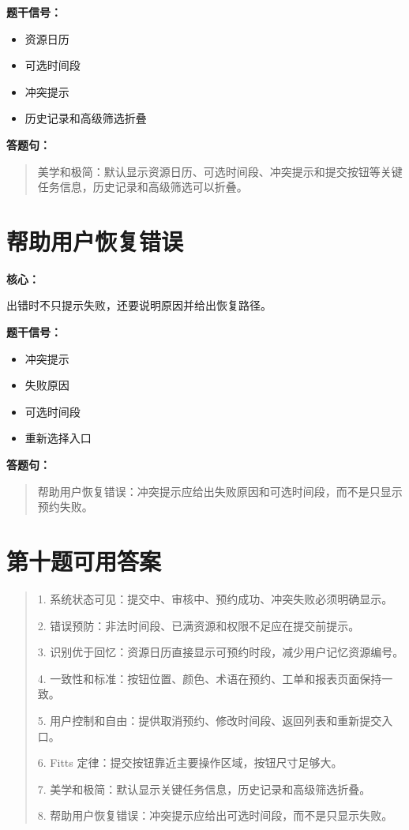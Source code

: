 \documentclass[UTF8,zihao=-4]{ctexart}
\newcommand{\principle}[1]{%
  \section*{\color{TitleBlue}#1}
}
\newcommand{\labeltext}[1]{%
  \textbf{#1}
}
\newenvironment{answerbox}{%
  \begin{quote}\small\color{TextGray}
}{%
  \end{quote}
}
\begin{document}
\labeltext{题干信号：}
\begin{itemize}
  \item 资源日历
  \item 可选时间段
  \item 冲突提示
  \item 历史记录和高级筛选折叠
\end{itemize}

\labeltext{答题句：}
\begin{answerbox}
美学和极简：默认显示资源日历、可选时间段、冲突提示和提交按钮等关键任务信息，历史记录和高级筛选可以折叠。
\end{answerbox}

\principle{帮助用户恢复错误}

\labeltext{核心：}
出错时不只提示失败，还要说明原因并给出恢复路径。

\labeltext{题干信号：}
\begin{itemize}
  \item 冲突提示
  \item 失败原因
  \item 可选时间段
  \item 重新选择入口
\end{itemize}

\labeltext{答题句：}
\begin{answerbox}
帮助用户恢复错误：冲突提示应给出失败原因和可选时间段，而不是只显示预约失败。
\end{answerbox}

\section*{\color{TitleBlue}第十题可用答案}

\begin{answerbox}
1. 系统状态可见：提交中、审核中、预约成功、冲突失败必须明确显示。

2. 错误预防：非法时间段、已满资源和权限不足应在提交前提示。

3. 识别优于回忆：资源日历直接显示可预约时段，减少用户记忆资源编号。

4. 一致性和标准：按钮位置、颜色、术语在预约、工单和报表页面保持一致。

5. 用户控制和自由：提供取消预约、修改时间段、返回列表和重新提交入口。

6. Fitts 定律：提交按钮靠近主要操作区域，按钮尺寸足够大。

7. 美学和极简：默认显示关键任务信息，历史记录和高级筛选折叠。

8. 帮助用户恢复错误：冲突提示应给出可选时间段，而不是只显示失败。
\end{answerbox}
\end{document}

